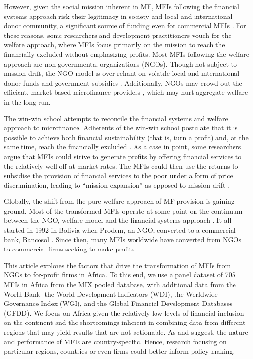 \documentclass[a4paper,nobind]{templates/ociamthesis}
\begin{document}
However, given the social mission inherent in MF, MFIs following the financial systems approach risk their legitimacy in society and local and international donor community, a significant source of funding even for commercial MFIs \autocite{nason2018behavioral}. For these reasons, some researchers and development practitioners vouch for the welfare approach, where MFIs focus primarily on the mission to reach the financially excluded without emphasizing profits. Most MFIs following the welfare approach are non-governmental organizations (NGOs). Though not subject to mission drift, the NGO model is over-reliant on volatile local and international donor funds and government subsidies \autocite{garmaise2013cheap,d2017aid}. Additionally, NGOs may crowd out the efficient, market-based microfinance providers \autocite{kota2007}, which may hurt aggregate welfare in the long run.

The win-win school attempts to reconcile the financial systems and welfare approach to microfinance. Adherents of the win-win school postulate that it is possible to achieve both financial sustainability (that is, turn a profit) and, at the same time, reach the financially excluded \autocite{kodongo2013individual}. As a case in point, some researchers argue that MFIs could strive to generate profits by offering financial services to the relatively well-off at market rates. The MFIs could then use the returns to subsidise the provision of financial services to the poor under a form of price discrimination, leading to ``mission expansion'' as opposed to mission drift \autocite{mersland2010microfinance}.

Globally, the shift from the pure welfare approach of MF provision is gaining ground. Most of the transformed MFIs operate at some point on the continuum between the NGO, welfare model and the financial systems approach \autocite{armendariz2013subsidy,d2013unsubsidized,hishigsuren2006transformation}. It all started in 1992 in Bolivia when Prodem, an NGO, converted to a commercial bank, Bancosol \autocite{fernando2004micro,creedy2018types}. Since then, many MFIs worldwide have converted from NGOs to commercial firms seeking to make profits.

This article explores the factors that drive the transformation of MFIs from NGOs to for-profit firms in Africa. To this end, we use a panel dataset of 705 MFIs in Africa from the MIX pooled database, with additional data from the World Bank- the World Development Indicators (WDI), the Worldwide Governance Index (WGI), and the Global Financial Development Databases (GFDD). We focus on Africa given the relatively low levels of financial inclusion on the continent \autocite{demirguc2018global}and the shortcomings inherent in combining data from different regions that may yield results that are not actionable. As \textcite{d2017ngos} and \textcite{wang2015ownership} suggest, the nature and performance of MFIs are country-specific. Hence, research focusing on particular regions, countries or even firms could better inform policy making.
\end{document}
